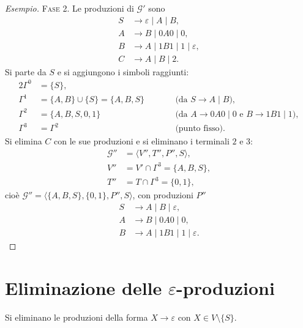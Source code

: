 \documentclass[a4paper, 11pt, oneside]{book}
\theoremstyle{formale}
\newenvironment{esempio}
    {\begin{proof}[\textit{Esempio}]\renewcommand{\qedsymbol}{$\diamond$}}
    {\end{proof}}
\begin{document}
\begin{esempio}
        \textsc{Fase 2}. Le produzioni di $\mathcal{G}'$ sono
        \begin{align*}
            S &\to \varepsilon \mid A \mid B, \\
            A &\to B \mid 0A0 \mid 0, \\
            B &\to A \mid 1B1 \mid 1 \mid \varepsilon, \\
            C &\to A \mid B \mid 2.
        \end{align*}
        Si parte da $S$ e si aggiungono i simboli raggiunti:
        \begin{alignat*}{2}
            \Gamma^0 &= \{S\}, & & \\
            \Gamma^1 &= \{A, B\} \cup \{S\} = \{A, B, S\}
                & \qquad & \text{(da $S \to A \mid B$)}, \\
            \Gamma^2 &= \{A, B, S, 0, 1\}
                & & \text{(da $A \to 0A0 \mid 0$ e $B \to 1B1 \mid 1$)}, \\
            \Gamma^3 &= \Gamma^2
                & & \text{(punto fisso)}.
        \end{alignat*}
        Si elimina $C$ con le sue produzioni e si eliminano i terminali $2$ e $3$:
        \begin{align*}
            \mathcal{G}'' &= \langle V'', T'', P'', S \rangle, \\
            V'' &= V' \cap \Gamma^3 = \{A, B, S\}, \\
            T'' &= T \cap \Gamma^3 = \{0, 1\},
        \end{align*}
        cio\`e $\mathcal{G}'' = \langle \{A, B, S\}, \{0, 1\}, P'', S \rangle$, con
        produzioni $P''$
        \begin{align*}
            S &\to A \mid B \mid \varepsilon, \\
            A &\to B \mid 0A0 \mid 0, \\
            B &\to A \mid 1B1 \mid 1 \mid \varepsilon.
        \end{align*}
    \end{esempio}

    \section{Eliminazione delle \texorpdfstring{$\varepsilon$}{epsilon}-produzioni}
    Si eliminano le produzioni della forma $X \to \varepsilon$ con $X \in V \setminus \{S\}$.
\end{document}
